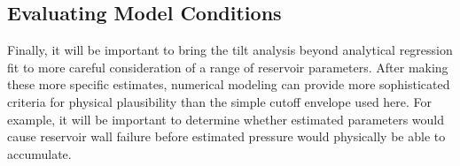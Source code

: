 \subsection{Evaluating Model Conditions}

Finally, it will be important to bring the tilt analysis beyond analytical regression fit to more careful consideration of a range of reservoir parameters. After making these more specific estimates, numerical modeling can provide more sophisticated criteria for physical plausibility than the simple cutoff envelope used here. For example, it will be important to determine whether estimated parameters would cause reservoir wall failure before estimated pressure would physically be able to accumulate. 